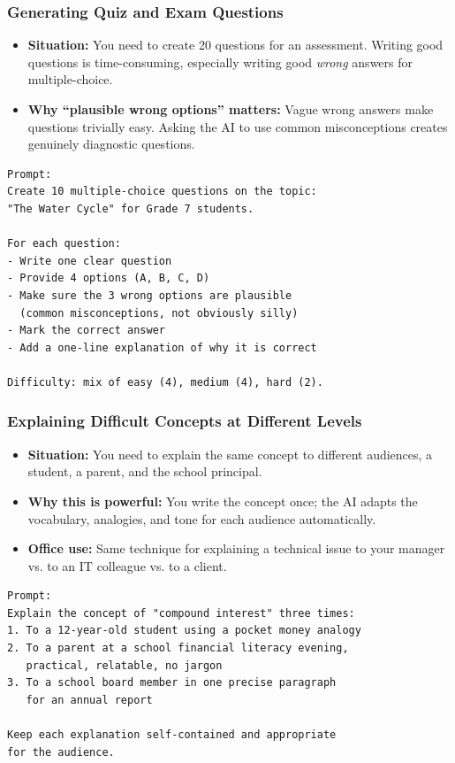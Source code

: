 \begin{frame}[fragile]\frametitle{Generating Quiz and Exam Questions}

    \begin{itemize}
        \item \textbf{Situation:} You need to create 20 questions for an assessment. Writing good questions is time-consuming, especially writing good \emph{wrong} answers for multiple-choice.
        \item \textbf{Why ``plausible wrong options'' matters:} Vague wrong answers make questions trivially easy. Asking the AI to use common misconceptions creates genuinely diagnostic questions.
    \end{itemize}
		
\begin{lstlisting}[language=HTML]
Prompt:
Create 10 multiple-choice questions on the topic: 
"The Water Cycle" for Grade 7 students.

For each question:
- Write one clear question
- Provide 4 options (A, B, C, D)
- Make sure the 3 wrong options are plausible 
  (common misconceptions, not obviously silly)
- Mark the correct answer
- Add a one-line explanation of why it is correct

Difficulty: mix of easy (4), medium (4), hard (2).
\end{lstlisting}



\end{frame}


\begin{frame}[fragile]\frametitle{Explaining Difficult Concepts at Different Levels}

    \begin{itemize}
        \item \textbf{Situation:} You need to explain the same concept to different audiences, a student, a parent, and the school principal.
        \item \textbf{Why this is powerful:} You write the concept once; the AI adapts the vocabulary, analogies, and tone for each audience automatically.
        \item \textbf{Office use:} Same technique for explaining a technical issue to your manager vs. to an IT colleague vs. to a client.
    \end{itemize}

\begin{lstlisting}[language=HTML]
Prompt:
Explain the concept of "compound interest" three times:
1. To a 12-year-old student using a pocket money analogy
2. To a parent at a school financial literacy evening, 
   practical, relatable, no jargon
3. To a school board member in one precise paragraph 
   for an annual report

Keep each explanation self-contained and appropriate 
for the audience.
\end{lstlisting}


\end{frame}


